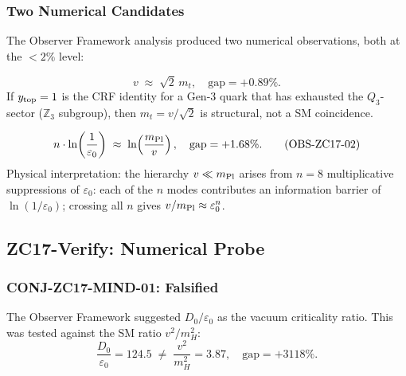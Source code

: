\documentclass[12pt, a4paper]{article}
\begin{document}
\subsubsection{Two Numerical Candidates}

The Observer Framework analysis produced two numerical
observations, both at the $< 2\%$ level:

\begin{derivedbox}[title={OBS-ZC17-01: Top Saturation ($0.89\%$)}]
\begin{equation}
  v \;\approx\; \sqrt{2}\,m_t,
  \quad \text{gap} = +0.89\%.
  \tag{OBS-ZC17-01}\label{zc17:eq:obs01}
\end{equation}
If $y_{\rm top}=1$ is the CRF identity for a Gen-3 quark
that has exhausted the $Q_3$-sector ($\mathbb{Z}_3$ subgroup),
then $m_t=v/\sqrt{2}$ is structural, not a SM coincidence.
\end{derivedbox}

\begin{derivedbox}[title={OBS-ZC17-02: Information Ladder ($1.68\%$)}]
\begin{equation}
  n\cdot\ln\!\left(\frac{1}{\varepsilon_0}\right)
  \;\approx\; \ln\!\left(\frac{m_{\rm Pl}}{v}\right),
  \quad \text{gap} = +1.68\%.
  \tag{OBS-ZC17-02}\label{zc17:eq:obs02}
\end{equation}
Physical interpretation: the hierarchy $v\ll m_{\rm Pl}$ arises
from $n=8$ multiplicative suppressions of $\varepsilon_0$:
each of the $n$ modes contributes an information barrier of
$\ln(1/\varepsilon_0)$; crossing all $n$ gives
$v/m_{\rm Pl}\approx\varepsilon_0^n$.
\end{derivedbox}

\subsection{ZC17-Verify: Numerical Probe}
\label{zc17:sec:verify}

\subsubsection{CONJ-ZC17-MIND-01: Falsified}

The Observer Framework suggested $D_0/\varepsilon_0$
as the vacuum criticality ratio. This was tested against
the SM ratio $v^2/m_H^2$:
\[
  \frac{D_0}{\varepsilon_0} = 124.5
  \;\neq\;
  \frac{v^2}{m_H^2} = 3.87,
  \quad \text{gap} = +3118\%.
\]
\end{document}
